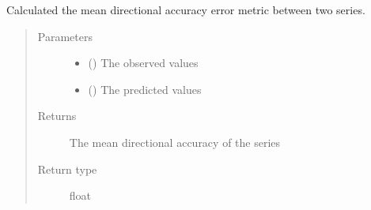 \documentclass[letterpaper,10pt,english]{sphinxmanual}
\begin{document}
\begin{fulllineitems}
\label{\detokenize{eval_inspect:Foresight.eval_inspect.mean_directional_accuracy}}
Calculated the mean directional accuracy error metric
between two series.
\begin{quote}\begin{description}
\item[{Parameters}] \leavevmode\begin{itemize}
\item {} 
 () \textendash{} The observed values

\item {} 
 () \textendash{} The predicted values

\end{itemize}

\item[{Returns}] \leavevmode
The mean directional accuracy of the series

\item[{Return type}] \leavevmode
float

\end{description}\end{quote}

\end{fulllineitems}

\end{document}
